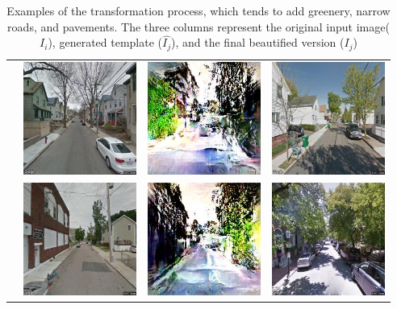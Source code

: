 \begin{table}
\begin{tabular}{l*3{C}@{}}
        & \includegraphics[width=10em]{u_7.jpeg} & \includegraphics[width=10em]{t_7.jpeg} &  \includegraphics[width=10em]{b_7.jpeg} \\ 
        & \includegraphics[width=10em]{u_8.jpeg} & \includegraphics[width=10em]{t_8.jpeg} &  \includegraphics[width=10em]{b_8.jpeg} \\ 
        \bottomrule 
    \end{tabular}
    \caption{Examples of the transformation process, which tends to add greenery, narrow roads, and  pavements. The three columns represent the original input image($I_i$), generated template ($\hat{I_j}$), and the final beautified version ($I_j$)}
    \label{fig:BeautyExample}
\end{table} 
